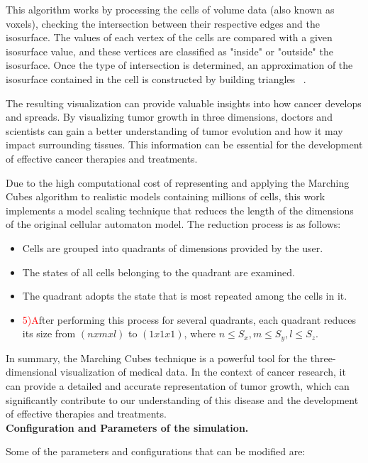 \documentclass[a4paper,11pt]{article}
\begin{document}
{This algorithm works by processing the cells of volume data (also known as voxels), checking the intersection between their respective edges and the isosurface. The values of each vertex of the cells are compared with a given isosurface value, and these vertices are classified as "inside" or "outside" the isosurface. Once the type of intersection is determined, an approximation of the isosurface contained in the cell is constructed by building triangles ~\cite{1}.

The resulting visualization can provide valuable insights into how cancer develops and spreads. By visualizing tumor growth in three dimensions, doctors and scientists can gain a better understanding of tumor evolution and how it may impact surrounding tissues. This information can be essential for the development of effective cancer therapies and treatments.

Due to the high computational cost of representing and applying the Marching Cubes algorithm to realistic models containing millions of cells, this work implements a model scaling technique that reduces the length of the dimensions of the original cellular automaton model. The reduction process is as follows:
\begin{itemize}
    \item Cells are grouped into quadrants of dimensions provided by the user.
    \item The states of all cells belonging to the quadrant are examined.
    \item The quadrant adopts the state that is most repeated among the cells in it.
    \item \textcolor{red}{5)A}fter performing this process for several quadrants, each quadrant reduces its size from $(n x m x l)$ to $(1 x 1 x 1)$, where $n \leq S_{x} ,m \leq S_{y},l \leq S_{z}$. 
\end{itemize}

In summary, the Marching Cubes technique is a powerful tool for the three-dimensional visualization of medical data. In the context of cancer research, it can provide a detailed and accurate representation of tumor growth, which can significantly contribute to our understanding of this disease and the development of effective therapies and treatments.\\

\textbf{Configuration and Parameters of the simulation.}

Some of the parameters and configurations that can be modified are:
}
\end{document}
